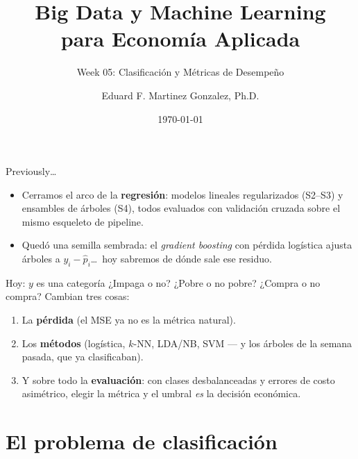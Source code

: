 \documentclass{beamer}
\title[BDML]{Big Data y Machine Learning \\ para Economía Aplicada}
\subtitle{Week 05: Clasificación y Métricas de Desempeño}
\author{Eduard F. Martinez Gonzalez, Ph.D.}
\institute[]{Departamento de Economía, Universidad Icesi}
\date{\today}
\newcommand{\1}{\mathbb{I}}
\begin{document}
\begin{frame}
\titlepage
\end{frame}

\begin{frame}{Previously\ldots}
\small
\begin{itemize}\itemsep5pt
  \item Cerramos el arco de la \textbf{regresión}: modelos lineales regularizados (S2--S3) y ensambles de árboles (S4), todos evaluados con validación cruzada sobre el mismo esqueleto de pipeline.
  \item Quedó una semilla sembrada: el \emph{gradient boosting} con pérdida logística ajusta árboles a $y_i - \hat{p}_i$\ldots\ hoy sabremos de dónde sale ese residuo.
\end{itemize}
\pause

\vspace{0.2cm}
\begin{block}{Hoy: $y$ es una categoría}
¿Impaga o no? ¿Pobre o no pobre? ¿Compra o no compra? Cambian tres cosas:
\begin{enumerate}\itemsep2pt
  \item La \textbf{pérdida} (el MSE ya no es la métrica natural).
  \item Los \textbf{métodos} (logística, $k$-NN, LDA/NB, SVM --- y los árboles de la semana pasada, que ya clasificaban).
  \item Y sobre todo la \textbf{evaluación}: con clases desbalanceadas y errores de costo asimétrico, elegir la métrica y el umbral \emph{es} la decisión económica.
\end{enumerate}
\end{block}
\end{frame}


\section{El problema de clasificación}
\begin{frame}[noframenumbering]
\tableofcontents[currentsection]
\end{frame}
\end{document}
